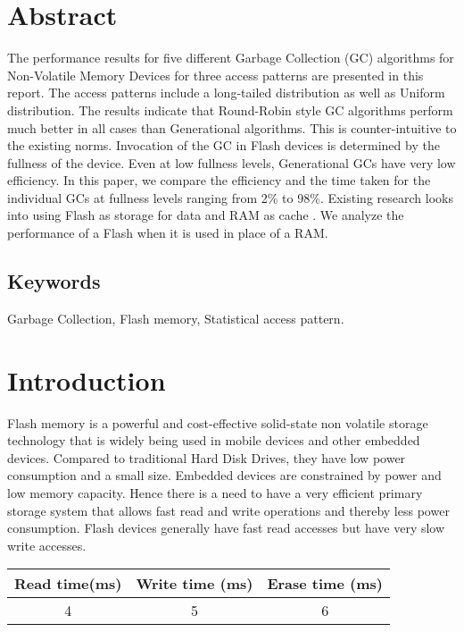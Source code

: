 \section{Abstract}
	The performance results for five different Garbage Collection (GC) algorithms for Non-Volatile Memory Devices for three access patterns are presented in this report. The access patterns include a long-tailed distribution as well as Uniform distribution. The results indicate that Round-Robin style GC algorithms perform much better in all cases than Generational algorithms. This is counter-intuitive to the existing norms. Invocation of the GC in Flash devices is determined by the fullness of the device. Even at low fullness levels, Generational GCs have very low efficiency. In this paper, we compare the efficiency and the time taken for the individual GCs at fullness levels ranging from 2\% to 98\%.  Existing research looks into using Flash as storage for data and RAM as cache \cite{Gupta09, Budilovsky11, Tjioe12}. We analyze the performance of a Flash when it is used in place of a RAM.

\subsection*{Keywords}
	Garbage Collection, Flash memory, Statistical access pattern.

\section{Introduction}
	Flash memory is a powerful and cost-effective solid-state non volatile storage technology that is widely being used in mobile devices and other embedded devices. Compared to traditional Hard Disk Drives, they have low power consumption and a small size. Embedded devices are constrained by power and low memory capacity. Hence there is a need to have a very efficient primary storage system that allows fast read and write operations and thereby less power consumption. Flash devices generally have fast read accesses but have very slow write accesses. \\

\begin{center}
   \begin{tabular} {|  c | c | c | }
       \hline
	{\bf Read time(ms)} & {\bf Write time (ms)} & {\bf Erase time (ms)} \\ \hline
	4 & 5 & 6 \\ 
       \hline
   \end{tabular}
\end{center}

